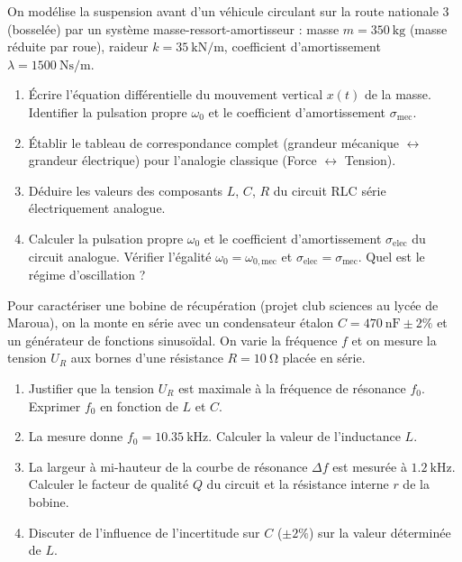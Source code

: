 \documentclass[11pt]{article}
\begin{document}
\begin{exercice}
On modélise la suspension avant d'un véhicule circulant sur la route nationale 3 (bosselée) par un système masse-ressort-amortisseur : masse $m = \SI{350}{\kilogram}$ (masse réduite par roue), raideur $k = \SI{35}{\kilo\newton\per\meter}$, coefficient d'amortissement $\lambda = \SI{1500}{\newton\second\per\meter}$.
\begin{enumerate}
    \item Écrire l'équation différentielle du mouvement vertical $x(t)$ de la masse. Identifier la pulsation propre $\omega_0$ et le coefficient d'amortissement $\sigma_{\text{mec}}$.
    \item Établir le tableau de correspondance complet (grandeur mécanique $\leftrightarrow$ grandeur électrique) pour l'analogie classique (Force $\leftrightarrow$ Tension).
    \item Déduire les valeurs des composants $L$, $C$, $R$ du circuit RLC série électriquement analogue.
    \item Calculer la pulsation propre $\omega_0$ et le coefficient d'amortissement $\sigma_{\text{elec}}$ du circuit analogue. Vérifier l'égalité $\omega_0 = \omega_{0,\text{mec}}$ et $\sigma_{\text{elec}} = \sigma_{\text{mec}}$. Quel est le régime d'oscillation ?
\end{enumerate}
\end{exercice}

\begin{exercice}
Pour caractériser une bobine de récupération (projet club sciences au lycée de Maroua), on la monte en série avec un condensateur étalon $C = \SI{470}{\nano\farad} \pm 2\%$ et un générateur de fonctions sinusoïdal. On varie la fréquence $f$ et on mesure la tension $U_R$ aux bornes d'une résistance $R = \SI{10}{\ohm}$ placée en série.
\begin{enumerate}
    \item Justifier que la tension $U_R$ est maximale à la fréquence de résonance $f_0$. Exprimer $f_0$ en fonction de $L$ et $C$.
    \item La mesure donne $f_0 = \SI{10,35}{\kilo\hertz}$. Calculer la valeur de l'inductance $L$.
    \item La largeur à mi-hauteur de la courbe de résonance $\Delta f$ est mesurée à $\SI{1,2}{\kilo\hertz}$. Calculer le facteur de qualité $Q$ du circuit et la résistance interne $r$ de la bobine.
    \item Discuter de l'influence de l'incertitude sur $C$ ($\pm 2\%$) sur la valeur déterminée de $L$.
\end{enumerate}
\end{exercice}
\end{document}

